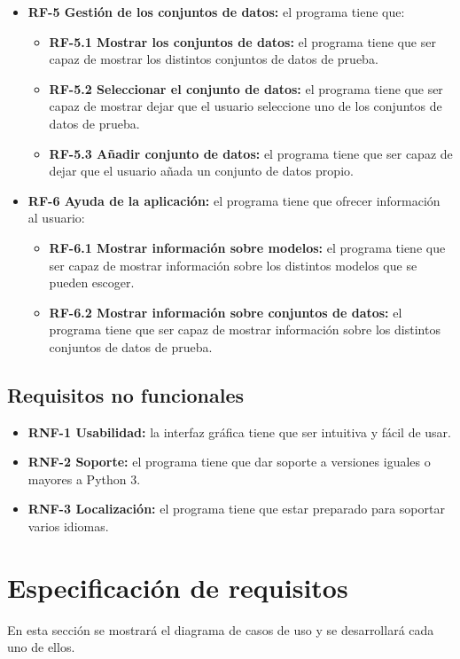 \begin{itemize}
\begin{itemize}
\end{itemize}
\item \textbf{RF-5 Gestión de los conjuntos de datos:} el programa tiene que:
\begin{itemize}
\tightlist
\item \textbf{RF-5.1 Mostrar los conjuntos de datos:} el programa tiene que ser capaz de mostrar los distintos conjuntos de datos de prueba.
\item \textbf{RF-5.2 Seleccionar el conjunto de datos:} el programa tiene que ser capaz de mostrar dejar que el usuario seleccione uno de los conjuntos de datos de prueba.
\item \textbf{RF-5.3 Añadir conjunto de datos:} el programa tiene que ser capaz de dejar que el usuario añada un conjunto de datos propio.
\end{itemize}
\item \textbf{RF-6 Ayuda de la aplicación:} el programa tiene que ofrecer información al usuario:
\begin{itemize}
\tightlist
\item \textbf{RF-6.1 Mostrar información sobre modelos:} el programa tiene que ser capaz de mostrar información sobre los distintos modelos que se pueden escoger.
\item \textbf{RF-6.2 Mostrar información sobre conjuntos de datos:} el programa tiene que ser capaz de mostrar información sobre los distintos conjuntos de datos de prueba.
\end{itemize}
\end{itemize}

\subsection{Requisitos no funcionales}
\begin{itemize}
\tightlist
\item \textbf{RNF-1 Usabilidad:} la interfaz gráfica tiene que ser intuitiva y fácil de usar.
\item \textbf{RNF-2 Soporte:} el programa tiene que dar soporte a versiones iguales o mayores a Python 3.
\item \textbf{RNF-3 Localización:} el programa tiene que estar preparado para soportar varios idiomas.
\end{itemize}

\section{Especificación de requisitos}
En esta sección se mostrará el diagrama de casos de uso y se desarrollará cada uno de ellos.

